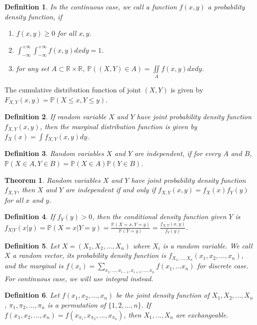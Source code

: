 \documentclass[11pt]{article}
\def\BP{{\bf P}}
\def\BR{{\mathbb R}}
\def\BP{{\mathbb P}}
\newtheorem{theorem}{Theorem}[section]
\newtheorem{definition}{Definition}[section]
\begin{document}
\begin{definition}
In the continuous case, we call a function $f(x,y)$ a probability density function, if
\begin{enumerate}
\item $f(x,y) \geq 0$ for all $x, y$.
\item $\int_{-\infty}^{+\infty}\int_{-\infty}^{+\infty} f(x,y) dxdy = 1$.
\item for any set $A \subset \BR \times \BR$, $\BP((X,Y) \in A) = \iint\limits_A f(x,y) dxdy$. 
\end{enumerate}
\end{definition}
The cumulative distribution function of joint $(X,Y)$ is given by $F_{X,Y} (x, y) = \BP(X \leq x, Y \leq y)$.

\begin{definition}
If random variable $X$ and $Y$ have joint probability density function $f_{X,Y}(x, y)$, then the marginal distribution function is given by $f_X(x) = \int f_{X, Y}(x, y) dy$.
\end{definition}

\begin{definition}
Random variables $X$ and $Y$ are independent, if for every $A$ and $B$, $\BP(X\in A, Y\in B) = \BP(X\in A)\BP(Y\in B)$.
\end{definition}

\begin{theorem}
Random variables $X$ and $Y$ have joint probability density function $f_{X,Y}$, then $X$ and $Y$ are independent if and only if $f_{X,Y}(x,y) = f_X(x) f_Y(y)$ for all $x$ and $y$.
\end{theorem}

\begin{definition}
If $f_Y(y) > 0$, then the conditional density function given $Y$ is $f_{X|Y}(x | y) = \BP(X = x| Y = y) = \frac{\BP(X=x, Y= y)}{\BP(Y= y)} = \frac{f_{X,Y}(x, y)}{f_Y(y)}$.
\end{definition}

\begin{definition}
Let $X = (X_1, X_2, ..., X_n)$ where $X_i$ is a random variable. We call $X$ a random vector, its probability density function is $f_{X_1, ..., X_n}(x_1, x_2, ..., x_n)$, and the marginal is $f(x_i)= \sum_{x_1, ..., x_{i-1}, x_{i+1}, ..., x_n} f(x_1, ... x_n)$ for discrete case. For continuous case, we will use integral instead.
\end{definition}

\begin{definition}
Let $f(x_1, x_2, ..., x_n)$ be the joint density function of $X_1, X_2, ..., X_n$, $\pi_1, \pi_2, ..., \pi_n$ is a permutation of $\{1, 2, ..., n\}$. If $f(x_1, x_2, ..., x_n) = f(x_{\pi_1}, x_{\pi_2}, ..., x_{\pi_n})$, then $X_1, ..., X_n$ are exchangeable.
\end{definition}
\end{document}
